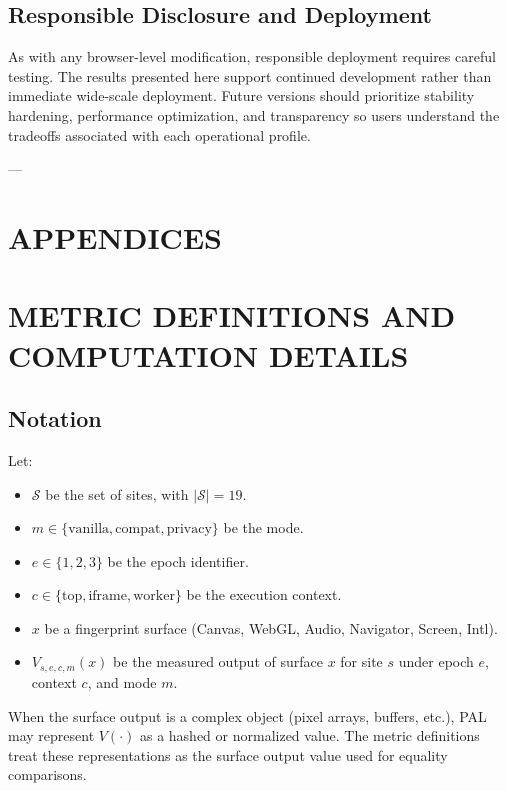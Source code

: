 \documentclass[11pt]{report}
\begin{document}
\section{Responsible Disclosure and Deployment}

As with any browser-level modification, responsible deployment requires careful testing. The results presented here support continued development rather than immediate wide-scale deployment. Future versions should prioritize stability hardening, performance optimization, and transparency so users understand the tradeoffs associated with each operational profile.

---

\chapter{APPENDICES}

\appendix

\chapter{METRIC DEFINITIONS AND COMPUTATION DETAILS}

\section{Notation}

Let:

\begin{itemize}
    \item $\mathcal{S}$ be the set of sites, with $|\mathcal{S}| = 19$.
    \item $m \in \{\text{vanilla},\text{compat},\text{privacy}\}$ be the mode.
    \item $e \in \{1,2,3\}$ be the epoch identifier.
    \item $c \in \{\text{top},\text{iframe},\text{worker}\}$ be the execution context.
    \item $x$ be a fingerprint surface (Canvas, WebGL, Audio, Navigator, Screen, Intl).
    \item $V_{s,e,c,m}(x)$ be the measured output of surface $x$ for site $s$ under epoch $e$, context $c$, and mode $m$.
\end{itemize}

When the surface output is a complex object (pixel arrays, buffers, etc.), PAL may represent $V(\cdot)$ as a hashed or normalized value. The metric definitions treat these representations as the surface output value used for equality comparisons.
\end{document}
